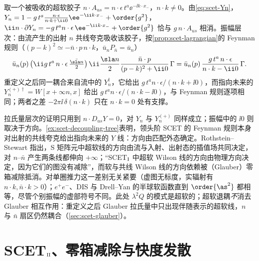 \begin{example}\label{ex:scet-decoupling-tree}
取一个被吸收的超软胶子 $n\cdot A_{us}=n\cdot\epsilon\,t^a\ee^{-\ii k\cdot x_-}$，$n\cdot k\neq0$。由\cref{eq:scet-Yn}，$Y_n=1-g\,t^a\frac{n\cdot\epsilon}{n\cdot k+\ii0}\ee^{-\ii k\cdot x_-}+\order{g^2}$，$\ii n\cdot\partial Y_n=-g\,t^an\cdot\epsilon\,\ee^{-\ii k\cdot x_-}+\order{g^2}$ 恰与 $g\,n\cdot A_{us}$ 相消。振幅层次：由流产生的出射 $n$ 共线夸克吸收该胶子，按\cref{prop:scet-lagrangian}的 Feynman 规则（$(p-k)^2\simeq-\bar n\cdot p\,n\cdot k$，$\bar u_nP_{\bar n}=\bar u_n$）
\[
\bar u_n(p)\,\big(\ii g\,t^a\,n\cdot\epsilon\,\tfrac{\bar{\sla n}}{2}\big)\,\ii\frac{\sla n}{2}\frac{\bar n\cdot p}{(p-k)^2+\ii0}\,\Gamma=\bar u_n(p)\,\frac{g\,t^a\,n\cdot\epsilon}{n\cdot k-\ii0}\,\Gamma .
\]
重定义之后同一耦合来自流中的 $Y_n^\dagger$，它给出 $g\,t^a n\cdot\epsilon/(n\cdot k+\ii0)$，而指向未来的 $Y_n^{(+)\dagger}=W[x+\infty n,x]$ 给出 $g\,t^an\cdot\epsilon/(n\cdot k-\ii0)$，与 Feynman 规则逐项相同；两者之差 $-2\pi\ii\,\delta(n\cdot k)$ 只在 $n\cdot k=0$ 处有支撑。%
\end{example}

\begin{remark}[$Y_n$ 的方向与 $\ii0$]\label{rem:scet-y-direction}
拉氏量层次的证明只用到 $n\cdot D_{us}Y=0$，对 $Y_n$ 与 $Y_n^{(+)}$ 同样成立；振幅中的 $\ii0$ 则取决于方向。\cref{ex:scet-decoupling-tree}表明，领头阶 SCET 的 Feynman 规则本身对出射的共线夸克给出指向未来的 $Y$ 线：方向由匹配外态确定\cite{Chay:2004zn}。Rothstein--Stewart 指出，S 矩阵元中超软线的方向由流与入射、出射态的插值场共同决定，对 $n$–$\bar n$ 产生两条线都伸向 $+\infty$\cite[第~10.1~节]{RothsteinStewart2016}；“SCET$_{\rm I}$ 中超软 Wilson 线的方向由物理方向决定，因为它们的图没有减除”，而软与共线 Wilson 线的方向依赖被（Glauber）零箱减除抵消\cite[第~4.2~节]{RothsteinStewart2016}。对单圈推力这一差别无关紧要（虚图无标度，实辐射有 $n\cdot k,\bar n\cdot k>0$）；$e^+e^-$、DIS 与 Drell--Yan 的半球软函数直到 $\order{\as^2}$ 都相等，尽管个别振幅的虚部符号不同\cite{Kang:2015moa}。此处 $\lambda^2Q$ 的模式是超软的；超软退耦\emph{不}消去 Glauber 相互作用：重定义之后 Glauber 拉氏量中只出现伴随表示的超软线，$n$ 与 $\bar n$ 扇区仍然耦合\cite[第~5.1~节]{RothsteinStewart2016}（\cref{sec:scet-glauber}）。
\end{remark}

\section{SCET\texorpdfstring{$_{\rm II}$}{II}、零箱减除与快度发散}\label{sec:scet-scet2}

